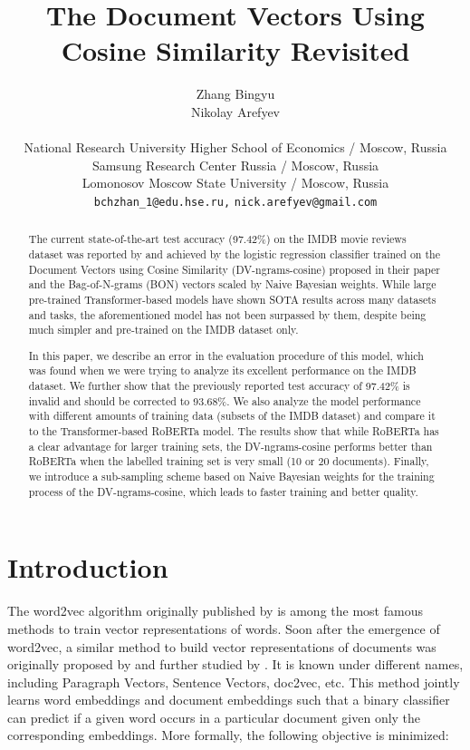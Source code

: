 \documentclass[11pt]{article}
\title{The Document Vectors Using Cosine Similarity Revisited}
\author{Zhang Bingyu \\
  \And Nikolay Arefyev \\
  \AND
  \vspace{-0.8cm}\\
  National Research University Higher School of Economics / Moscow, Russia \\
  Samsung Research Center Russia / Moscow, Russia \\
  Lomonosov Moscow State University / Moscow, Russia \\
  \texttt{bchzhan\_1@edu.hse.ru,} \texttt{nick.arefyev@gmail.com} \\
}
\begin{document}
\maketitle
\begin{abstract}
The current state-of-the-art test accuracy (97.42\%) on the IMDB movie reviews dataset was reported by \citet{thongtan-phienthrakul-2019-sentiment} and achieved by the logistic regression classifier trained on the Document Vectors using Cosine Similarity (DV-ngrams-cosine) proposed in their paper and the Bag-of-N-grams (BON) vectors scaled by Naive Bayesian weights. While large pre-trained Transformer-based models have shown SOTA results across many datasets and tasks, the aforementioned model has not been surpassed by them, despite being much simpler and pre-trained on the IMDB dataset only. 

In this paper, we describe an error in the evaluation procedure of this model, which was found when we were trying to analyze its excellent performance on the IMDB dataset. We further show that the previously reported test accuracy of 97.42\% is invalid and should be corrected to 93.68\%. We also analyze the model performance with different amounts of training data (subsets of the IMDB dataset) and compare it to the Transformer-based RoBERTa model. The results show that while RoBERTa has a clear advantage for larger training sets,
the DV-ngrams-cosine performs better than RoBERTa when the labelled training set is very small (10 or 20 documents). Finally, we introduce a sub-sampling scheme based on Naive Bayesian weights for the training process of the DV-ngrams-cosine, which leads to faster training and better quality. 
\end{abstract}

\section{Introduction}

The word2vec algorithm originally published by \citet{mik_wordvec2013} is among the most famous methods to train vector representations of words. Soon after the emergence of word2vec, a similar method to build vector representations of documents was originally proposed by \citet{mik_docvec2014} and further studied by \citet{mes_2015}. It is known under different names, including Paragraph Vectors, Sentence Vectors, doc2vec, etc. This method jointly learns word embeddings and document embeddings such that a binary classifier can predict if a given word occurs in a particular document given only the corresponding embeddings. More formally, the following objective is minimized:
\end{document}
